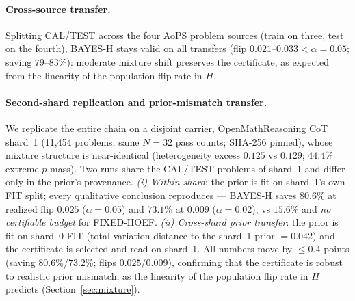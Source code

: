 \documentclass{article}
\theoremstyle{definition}
\theoremstyle{remark}
\begin{document}
\paragraph{Cross-source transfer.} Splitting CAL/TEST across the four AoPS
problem sources (train on three, test on the fourth), BAYES-H stays valid on
all transfers (flip $0.021$--$0.033<\alpha=0.05$; saving $79$--$83\%$):
moderate mixture shift preserves the certificate, as expected from the
linearity of the population flip rate in $H$.

\paragraph{Second-shard replication and prior-mismatch transfer.}
We replicate the entire chain on a disjoint carrier, OpenMathReasoning CoT
shard~1 (11{,}454 problems, same $N{=}32$ pass counts; SHA-256 pinned), whose
mixture structure is near-identical (heterogeneity excess $0.125$ vs $0.129$;
$44.4\%$ extreme-$p$ mass). Two runs share the CAL/TEST problems of shard~1 and
differ only in the prior's provenance. \emph{(i) Within-shard}: the prior is
fit on shard~1's own FIT split; every qualitative conclusion reproduces ---
BAYES-H saves $80.6\%$ at realized flip $0.025$ ($\alpha=0.05$) and $73.1\%$ at
$0.009$ ($\alpha=0.02$), vs $15.6\%$ and \emph{no certifiable budget} for
FIXED-HOEF. \emph{(ii) Cross-shard prior transfer}: the prior is fit on
shard~0 FIT (total-variation distance to the shard~1 prior $=0.042$) and the
certificate is selected and read on shard~1. All numbers move by $\le0.4$
points (saving $80.6\%$/$73.2\%$; flips $0.025$/$0.009$), confirming that the
certificate is robust to realistic prior mismatch, as the linearity of the
population flip rate in $H$ predicts (Section~\ref{sec:mixture}).
\end{document}
